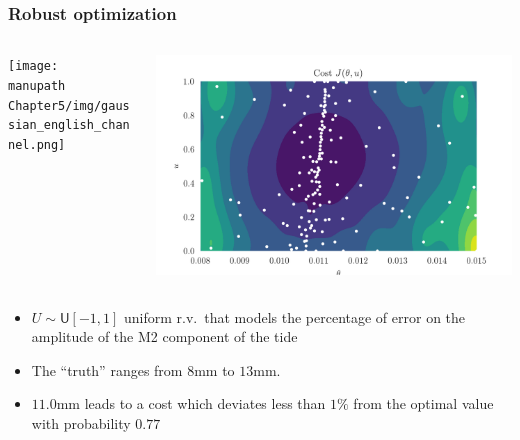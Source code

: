 \documentclass[11pt]{beamer}
\newcommand{\UU}{U}
\newcommand\manupath{/home/victor/acadwriting/Manuscrit/Text/}
\begin{document}
\begin{frame}
  \frametitle{Robust optimization}
  \begin{center}
    \begin{columns}
      \begin{column}{.5\textwidth}
  \texttt{[image: \\manupath Chapter5/img/gaussian\_english\_channel.png]}
\end{column}
\begin{column}{.5\textwidth}
  \includegraphics[width=\textwidth]{croco.png}
\end{column}
\end{columns}
\end{center}

  \begin{itemize}
  \item $\UU\sim \mathsf{U}[-1, 1]$ uniform r.v.\ that models the percentage of error on the amplitude of the M2 component of the tide
  \item The ``truth'' ranges from $8$mm to $13$mm.
  \item $11.0$mm leads to a cost which deviates less than $1\%$ from the optimal value with probability $0.77$
\end{itemize}
\end{frame}


\end{document}
